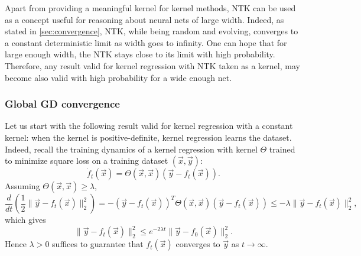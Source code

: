 \documentclass{article}
\begin{document}

    Apart from providing a meaningful kernel for kernel methods, NTK can be used as a concept useful for reasoning about neural nets of large width.
    Indeed, as stated in \cref{sec:convergence}, NTK, while being random and evolving, converges to a constant deterministic limit as width goes to infinity.
    One can hope that for large enough width, the NTK stays close to its limit with high probability.
    Therefore, any result valid for kernel regression with NTK taken as a kernel, may become also valid with high probability for a wide enough net.

    \subsubsection{Global GD convergence}

    Let us start with the following result valid for kernel regression with a constant kernel:
    when the kernel is positive-definite, kernel regression learns the dataset.
    Indeed, recall the training dynamics of a kernel regression with kernel $\Theta$ trained to minimize square loss on a training dataset $(\vec x, \vec y)$:
    \begin{equation}
        \dot f_t(\vec x)
        = \Theta(\vec x, \vec x) (\vec y - f_t(\vec x)).
    \end{equation}
    Assuming $\Theta(\vec x, \vec x) \geq \lambda$,
    \begin{equation}
        \frac{d}{dt}\left(\frac{1}{2} \| \vec y - f_t(\vec x) \|_2^2\right)
        = -(\vec y - f_t(\vec x))^T \Theta(\vec x, \vec x) (\vec y - f_t(\vec x))
        \leq -\lambda \| \vec y - f_t(\vec x) \|_2^2,
    \end{equation}
    which gives
    \begin{equation}
        \| \vec y - f_t(\vec x) \|_2^2
        \leq e^{-2\lambda t} \| \vec y - f_0(\vec x) \|_2^2.
    \end{equation}
    Hence $\lambda > 0$ suffices to guarantee that $f_t(\vec x)$ converges to $\vec y$ as $t \to \infty$.
\end{document}
